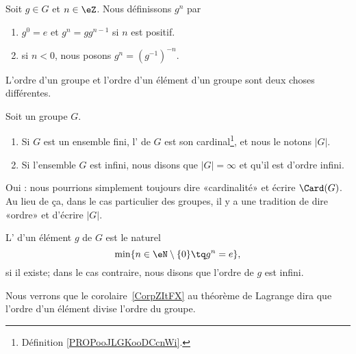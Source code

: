 \begin{definition}
	Soit \( g\in G\) et \( n\in \eZ\). Nous définissons \( g^n\) par
	\begin{enumerate}
		\item
		      \( g^0=e\) et \( g^n=gg^{n-1}\) si \( n\) est positif.
		\item
		      si \( n<0\), nous posons \( g^n=(g^{-1})^{-n}\).
	\end{enumerate}
\end{definition}

L'ordre d'un groupe et l'ordre d'un élément d'un groupe sont deux choses différentes.

\begin{definition}    \label{DEFooKWBCooMlmpCP}
    Soit un groupe \( G\).
	\begin{enumerate}
		\item
            Si \( G\) est un ensemble fini, l' de \( G\) est son cardinal\footnote{Définition \ref{PROPooJLGKooDCcnWi}.}, et nous le notons \( | G |\).
        \item
            Si l'ensemble \( G\) est infini, nous disons que \( | G |=\infty\) et qu'il est d'ordre infini.
	\end{enumerate}
    Oui : nous pourrions simplement toujours dire «cardinalité» et écrire \( \Card(G)\). Au lieu de ça, dans le cas particulier des groupes, il y a une tradition de dire «ordre» et d'écrire \( | G |\).
\end{definition}

\begin{definition}      \label{DEFooKSTVooOObpgC}
      L' d'un élément \( g\) de \( G\) est le naturel
      \begin{equation}
          \min\{ n\in\eN\setminus\{ 0 \}\tq g^n=e \},
      \end{equation}
      si il existe; dans le cas contraire, nous disons que l'ordre de \( g\) est infini.
\end{definition}

\begin{normaltext}
    Nous verrons que le corolaire~\ref{CorpZItFX} au théorème de Lagrange dira que l'ordre d'un élément divise l'ordre du groupe.
\end{normaltext}

